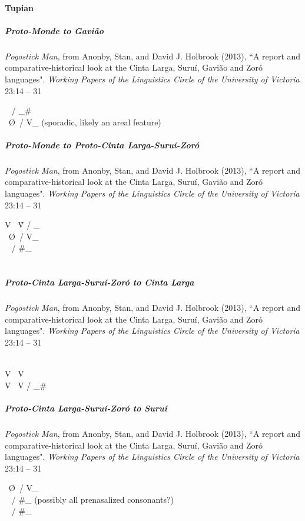 \documentclass[11pt]{article}
\newcommand{\ipa}{\textipa}
\newcommand{\change}{\textrightarrow}
\begin{document}
\paragraph{Tupian}

\subparagraph{Proto-Monde to Gavi\~{a}o}{\it Pogostick Man}, from Anonby, Stan, and David J. Holbrook (2013), ``A report and comparative-historical look at the Cinta Larga, Suru\'{i}, Gavi\~{a}o and Zor\'{o} languages". {\it Working Papers of the Linguistics Circle of the University of Victoria} 23:14 -- 31

\ipa{p} \change\ \ipa{v} / _\#\\
\ipa{h} \change\ \O\ / V_ (sporadic, likely an areal feature)

\subparagraph{Proto-Monde to Proto-Cinta Larga-Suru\'{i}-Zor\'{o}}{\it Pogostick Man}, from Anonby, Stan, and David J. Holbrook (2013), ``A report and comparative-historical look at the Cinta Larga, Suru\'{i}, Gavi\~{a}o and Zor\'{o} languages". {\it Working Papers of the Linguistics Circle of the University of Victoria} 23:14 -- 31

V \change\ \~{V} / _\ipa{h}\\
\ipa{h} \change\ \O\ / V_\\
\ipa{v} \change\ \ipa{w} / \#_\\
\ipa{tS} \change\ \ipa{S}

\subparagraph{Proto-Cinta Larga-Suru\'{i}-Zor\'{o} to Cinta Larga}{\it Pogostick Man}, from Anonby, Stan, and David J. Holbrook (2013), ``A report and comparative-historical look at the Cinta Larga, Suru\'{i}, Gavi\~{a}o and Zor\'{o} languages". {\it Working Papers of the Linguistics Circle of the University of Victoria} 23:14 -- 31

\ipa{o} \change\ \ipa{u}\\
V\ipa{h} \change\ V\ipa{:}\\
V \change\ V\ipa{:} / _\#\\

\subparagraph{Proto-Cinta Larga-Suru\'{i}-Zor\'{o} to Suru\'{i}}{\it Pogostick Man}, from Anonby, Stan, and David J. Holbrook (2013), ``A report and comparative-historical look at the Cinta Larga, Suru\'{i}, Gavi\~{a}o and Zor\'{o} languages". {\it Working Papers of the Linguistics Circle of the University of Victoria} 23:14 -- 31

\ipa{h} \change\ \O\ / V_\\
\ipa{\super Ng} \change\ \ipa{g} / \#_ (possibly all prenasalized consonants?)\\
\ipa{b} \change\ \ipa{m} / \#_
\end{document}
